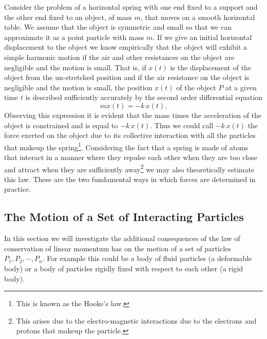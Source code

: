 \documentclass[graybox,envcountchap,sectrefs]{svmonoMuga}
\begin{document}
\begin{example}\label{Example:Force}
Consider the problem of a horizontal spring with one end fixed to a support and the other end fixed to an object, of mass $m$, that moves on a smooth horizontal table. We assume that the object is symmetric and small so that we can approximate it as a point particle with mass $m$. If we 
give an initial horizontal displacement to the object we know empirically that the object will exhibit a simple harmonic motion if the air and other resistances on the object are
negligible and the motion is small.
That is, if $x(t)$ is the displacement of the object from the un-stretched position and if the air resistance on the object is negligible and the motion is small, the position $x(t)$ of the object $P$ at a given time $t$ is described sufficiently accurately by the second order differential equation
\[
m\ddot{x}(t)=-k\,x(t).
\]
Observing this expression it is evident that the mass times the acceleration of the object is constrained and is equal to $-k\,x(t)$. Thus we could call $-k\,x(t)$ the force exerted on the object due to its collective interaction with all the particles that makeup the
spring\footnote{This is known as the Hooke's law.}. Considering the fact that a spring is made of atoms that interact in a manner where they repulse 
each other when they are too close and attract when they are sufficiently away\footnote{This arises due to the electro-magnetic interactions due to the electrons and protons that 
makeup the particle.} we may also theoretically estimate this law. These are the two fundamental ways in which forces are determined in practice.
\end{example}





\subsection{The Motion of a Set of Interacting Particles}\label{Secn:InteractingParticleMotion}
In this section we will investigate the additional consequences of the law of conservation of linear momentum has on the motion of a set of particles $P_1,P_2,\cdots,P_n$. For example this could be a body of fluid particles (a deformable body) or a body of particles rigidly fixed with respect to each other (a rigid body). 
\end{document}
